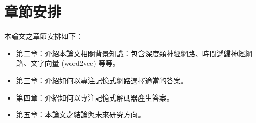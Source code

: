 \section{章節安排}
本論文之章節安排如下：
\begin{itemize}
\itemsep -2pt
    \item 第二章：介紹本論文相關背景知識：包含深度類神經網路、時間遞歸神經網路、文字向量 (word2vec) 等等。
    \item 第三章：介紹如何以專注記憶式網路選擇適當的答案。
    \item 第四章：介紹如何以專注記憶式解碼器產生答案。
    \item 第五章：本論文之結論與未來研究方向。
\end{itemize}
